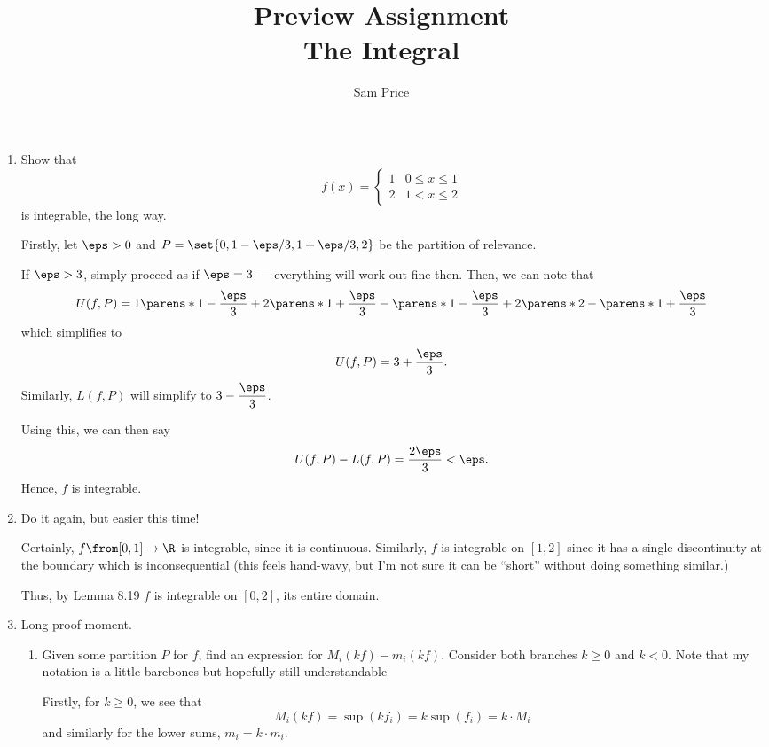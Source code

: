 \documentclass{article}
\author{Sam Price}
\date{}
\title{Preview Assignment\\\Large The Integral}
\begin{document}
\maketitle

\begin{enumerate}

  \item Show that
        \[ f(x) = \begin{cases} 1 & 0 \le x \le 1 \\ 2 & 1 < x \le 2 \end{cases} \]
        is integrable, the long way.

        Firstly, let $\eps > 0$ and $P = \set{0, 1 - \eps/3, 1 + \eps/3, 2}$ be the partition of relevance.

        If $\eps > 3$, simply proceed as if $\eps = 3$ --- everything will work out fine then.
        Then, we can note that
        \[ U(f, P) = 1\parens*{1 - \frac{\eps}{3}} + 2\parens*{1 + \frac{\eps}{3} - \parens*{1 - \frac{\eps}{3}}} + 2\parens*{2 - \parens*{1 + \frac{\eps}{3}}} \]
        which simplifies to
        \[ U(f, P) = 3 + \frac{\eps}{3}. \]
        Similarly, $L(f, P)$ will simplify to $3 - \dfrac{\eps}{3}$.

        Using this, we can then say
        \[ U(f, P) - L(f, P) = \frac{2\eps}{3} < \eps. \]
        Hence, $f$ is integrable.

  \item Do it again, but easier this time!

        Certainly, $f\from [0, 1] \to \R$ is integrable, since it is continuous.
        Similarly, $f$ is integrable on $[1, 2]$ since it has a single discontinuity at the boundary which is inconsequential
        (this feels hand-wavy, but I'm not sure it can be ``short'' without doing something similar.)

        Thus, by Lemma 8.19 $f$ is integrable on $[0, 2]$, its entire domain.

  \item Long proof moment.

        \begin{enumerate}

          \item Given some partition $P$ for $f$, find an expression for $M_{i}(kf) - m_{i}(kf)$. Consider both branches $k \ge 0$ and $k < 0$.
                Note that my notation is a little barebones but hopefully still understandable

                Firstly, for \underline{$k \geqslant 0$}, we see that
                \[ M_{i}(kf) = \sup(kf_{i}) = k \sup(f_{i}) = k \cdot M_{i} \]
                and similarly for the lower sums, $m_{i} = k \cdot m_{i}$.


\end{enumerate}
\end{enumerate}
\end{document}
